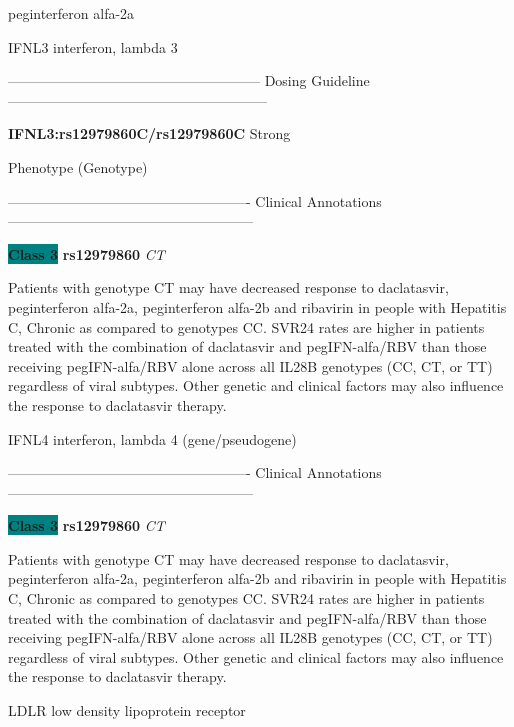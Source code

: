 \documentclass{resume} %
\begin{document}
\begin{rSection}{ peginterferon alfa-2a }
\begin{rSubsection}{ IFNL3 }{ interferon, lambda 3 }{}{}
\item[]
\item[] ------------------------------------------------------ Dosing Guideline --------------------------------------------------------\newline
\item[]
\item[] \textbf{ IFNL3:rs12979860C/rs12979860C } Strong
\item[] Phenotype (Genotype)\newline
\item[] 
\item[] ---------------------------------------------------- Clinical Annotations -----------------------------------------------------\newline
\item \textbf{\colorbox{teal} {Class 3}} \textbf{ rs12979860 } \textit{ CT }
\item[] Patients with genotype CT may have decreased response to daclatasvir, peginterferon alfa-2a, peginterferon alfa-2b and ribavirin in people with Hepatitis C, Chronic as compared to genotypes CC. SVR24 rates are higher in patients treated with the combination of daclatasvir and pegIFN-alfa/RBV than those receiving pegIFN-alfa/RBV alone across all IL28B genotypes (CC, CT, or TT) regardless of viral subtypes. Other genetic and clinical factors may also influence the response to daclatasvir therapy.
\end{rSubsection}\begin{rSubsection}{ IFNL4 }{ interferon, lambda 4 (gene/pseudogene) }{}{}
\item[]

\item[] ---------------------------------------------------- Clinical Annotations -----------------------------------------------------\newline
\item \textbf{\colorbox{teal} {Class 3}} \textbf{ rs12979860 } \textit{ CT }
\item[] Patients with genotype CT may have decreased response to daclatasvir, peginterferon alfa-2a, peginterferon alfa-2b and ribavirin in people with Hepatitis C, Chronic as compared to genotypes CC. SVR24 rates are higher in patients treated with the combination of daclatasvir and pegIFN-alfa/RBV than those receiving pegIFN-alfa/RBV alone across all IL28B genotypes (CC, CT, or TT) regardless of viral subtypes. Other genetic and clinical factors may also influence the response to daclatasvir therapy.
\end{rSubsection}\begin{rSubsection}{ LDLR }{ low density lipoprotein receptor }{}{}
\item[]


\end{rSubsection}
\end{rSection}
\end{document}
